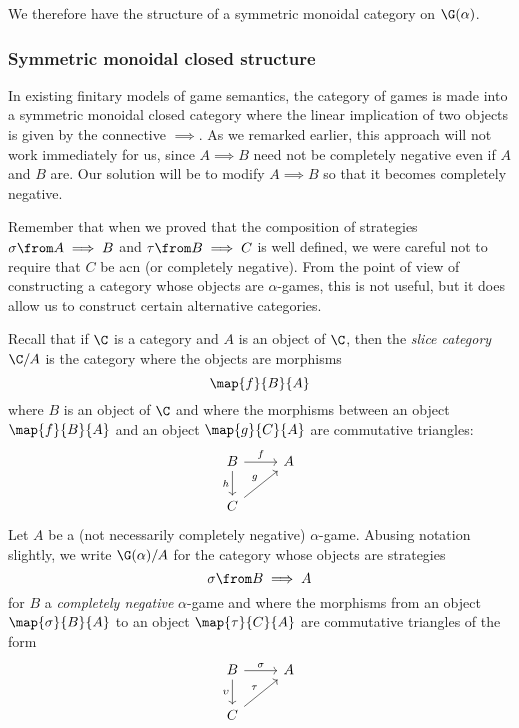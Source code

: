 \documentclass[11pt]{article} %
\begin{document}
We therefore have the structure of a symmetric monoidal category on $\G(\alpha)$.  

\subsubsection{Symmetric monoidal closed structure}
\label{TransSMCCSex}

In existing finitary models of game semantics, the category of games is made into a symmetric monoidal closed category where the linear implication of two objects is given by the connective $\implies$.  As we remarked earlier, this approach will not work immediately for us, since $A\implies B$ need not be completely negative even if $A$ and $B$ are.  Our solution will be to modify $A\implies B$ so that it becomes completely negative.  

Remember that when we proved that the composition of strategies $\sigma\from A\implies B$ and $\tau\from B\implies C$ is well defined, we were careful not to require that $C$ be acn (or completely negative).  From the point of view of constructing a category whose objects are $\alpha$-games, this is not useful, but it does allow us to construct certain alternative categories.

\begin{definition}
  Recall that if $\C$ is a category and $A$ is an object of $\C$, then the \emph{slice category} $\C/A$ is the category where the objects are morphisms
  \[
    \map{f}{B}{A}
    \]
  where $B$ is an object of $\C$ and where the morphisms between an object $\map{f}{B}{A}$ and an object $\map{g}{C}{A}$ are commutative triangles:
  \[
    \begin{tikzcd}
      B \arrow[r, "f"] \arrow[d, "h"']
       & A \\
      C \arrow[ur, "g"]
        &
    \end{tikzcd}
    \]
  Let $A$ be a (not necessarily completely negative) $\alpha$-game.  Abusing notation slightly, we write $\G(\alpha)/A$ for the category whose objects are strategies
  \[
    \sigma\from B\implies A
    \]
  for $B$ a \emph{completely negative} $\alpha$-game and where the morphisms from an object $\map{\sigma}{B}{A}$ to an object $\map{\tau}{C}{A}$ are commutative triangles of the form
  \[
    \begin{tikzcd}
      B \arrow[r, "\sigma"] \arrow[d, "\upsilon"']
       & A \\
      C \arrow[ur, "\tau"]
        &
    \end{tikzcd}
    \]
\end{definition}
\end{document}
